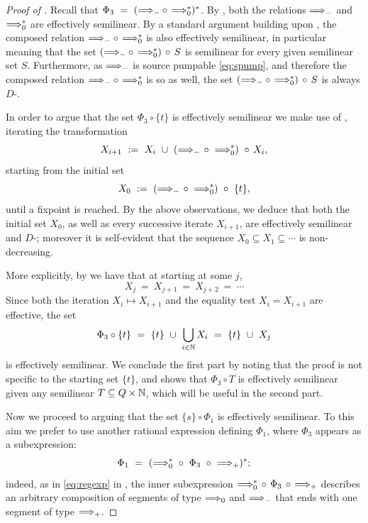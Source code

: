 \begin{proof}[Proof of ]
Recall that $\Phi_3 \ = \ ({\Longrightarrow_{-}} \circ\, {\Longrightarrow_{0}^\ast})^\ast$.
By , both the relations $\Longrightarrow_{-}$ and
$\Longrightarrow_{0}^*$ are effectively semilinear.
By a standard argument building upon \cite[Thm.~6]{taming},
the composed relation 
${\Longrightarrow_{-}} \circ\, {\Longrightarrow_{0}^\ast}$ is also effectively semilinear,
in particular meaning that
the set
$({\Longrightarrow_{-}} \circ\, {\Longrightarrow_{0}^\ast}) \,\circ\, S$ is semilinear for every given 
semilinear set $S$.
Furthermore, as $\Longrightarrow_{-}$ is source pumpable \eqref{eq:spump},
and therefore the composed relation ${\Longrightarrow_{-}} \circ\, {\Longrightarrow_{0}^\ast}$
is so as well, the set
$({\Longrightarrow_{-}} \circ\, {\Longrightarrow_{0}^\ast}) \,\circ\, S$ is always $D$-\saturated.

In order to  argue that the set $\Phi_3 \circ \{t\}$
is effectively semilinear we make use of ,
iterating the transformation
\[
    X_{i+1} \ := \ X_{i} \ \cup \ ({\Longrightarrow_{-}} \,\circ\  {\Longrightarrow_{0}^\ast}) \ \circ\ \! X_{i},
\]
starting from the initial set
\[
    X_0 \ := \ ({\Longrightarrow_{-}} \,\circ\ {\Longrightarrow_{0}^\ast}) \ \circ\ \{t\},
\]
until a fixpoint is reached. By the above observations, we deduce that
both the initial set $X_0$, as well as every successive iterate $X_{i+1}$,
are effectively semilinear and $D$-\saturated; moreover it is
self-evident that the sequence $X_0 \subseteq X_1 \subseteq \cdots$
is non-decreasing.

More explicitly, by  we have that at starting at some $j$,
\[
X_j \ = \ X_{j+1} \ = \ X_{j+2} \ = \ \cdots
\] 
Since both the iteration
$X_i \mapsto X_{i+1}$ and the equality test $X_i = X_{i+1}$ are effective,
the set 
\[
\Phi_3\circ \{t\} \ = \ \{t\} \ \cup \ \bigcup_{i\in\N} X_i \ = \ 
\{t\} \ \cup \ X_j
\]
is effectively semilinear.
We conclude the first part by 
noting that the proof is not specific to the starting set $\{t\}$,
and shows that $\Phi_3 \circ T$ is effectively 
semilinear given any semilinear $T\subseteq Q\times\mathbb{N}$,
which will be useful in the second part.

\medskip

Now we proceed to arguing that
the set $\{s\} \circ \Phi_1$ is effectively semilinear.
To this aim we prefer to use another rational expression defining 
$\Phi_1$, where $\Phi_3$ appears as a subexpression:
\[
    \Phi_1 \ = \ ({\Longrightarrow_{0}^*} \ \circ \ \Phi_3 \ \circ \ {\Longrightarrow_{+}})^\ast;
\]
indeed, as in \eqref{eq:regexp} in , the inner subexpression ${\Longrightarrow_{0}^*} \,\circ\, \Phi_3 \,\circ\, {\Longrightarrow_{+}}$ 
describes an arbitrary
composition of segments of type $\Longrightarrow_{0}$ and $\Longrightarrow_{-}$ that ends 
with one segment of type $\Longrightarrow_{+}$.


\end{proof}
